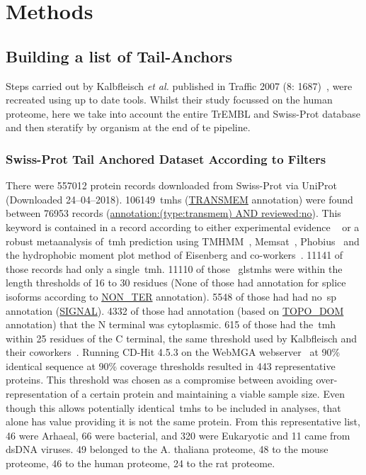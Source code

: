 \section{Methods}

\subsection{Building a list of Tail-Anchors}
Steps carried out by Kalbfleisch \textit{et al.} published in Traffic 2007 (8: 1687)~\cite{Kalbfleisch2007}, were recreated using up to date tools. Whilst their study focussed on the human proteome, here we take into account the entire TrEMBL and Swiss-Prot database and then steratify by organism at the end of te pipeline.

\subsubsection{Swiss-Prot Tail Anchored Dataset According to Filters}
There were 557012 protein records downloaded from Swiss-Prot via UniProt~\cite{TheUniProtConsortium2014} (Downloaded 24--04--2018).
106149~\gls{tmh}s (\url{TRANSMEM} annotation) were found between 76953 records (\url{annotation:(type:transmem) AND reviewed:no}).
This keyword is contained in a record according to either experimental evidence ~\cite{TheUniProtConsortium2014} or a robust metaanalysis of~\gls{tmh} prediction using TMHMM~\cite{Krogh2001}, Memsat~\cite{Jones2007}, Phobius~\cite{Kall2004,Kall2007} and the hydrophobic moment plot method of Eisenberg and co-workers~\cite{Eisenberg1984}.
11141 of those records had only a single~\gls{tmh}.
11110 of those ~gls{tmh}s were within the length thresholds of 16 to 30 residues (None of those had annotation for splice isoforms according to \url{NON_TER} annotation).
5548 of those had had no~\gls{sp} annotation (\url{SIGNAL}).
4332 of those had annotation (based on \url{TOPO_DOM} annotation) that the N terminal was cytoplasmic.
615 of those had the~\gls{tmh} within 25 residues of the C terminal, the same threshold used by Kalbfleisch and their coworkers~\cite{Kalbfleisch2007}.
Running CD-Hit 4.5.3 on the WebMGA webserver~\cite{Huang2010, Wu2011} at 90\% identical sequence at 90\% coverage thresholds resulted in 443 representative proteins.
This threshold was chosen as a compromise between avoiding over-representation of a certain protein and maintaining a viable sample size.
Even though this allows potentially identical~\gls{tmh}s to be included in analyses, that alone has value providing it is not the same protein.
From this representative list, 46 were Arhaeal, 66 were bacterial, and 320 were Eukaryotic and 11 came from dsDNA viruses.
49 belonged to the A. thaliana proteome, 48 to the mouse proteome, 46 to the human proteome, 24 to the rat proteome.

